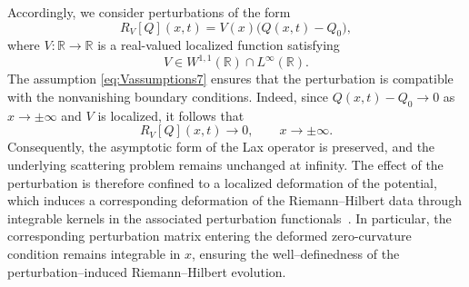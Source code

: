 \documentclass[11pt]{amsart}
\theoremstyle{definition}
\numberwithin{equation}{section}
\begin{document}
Accordingly, we consider perturbations of the form
\begin{equation}
R_V[Q](x,t)=V(x)\bigl(Q(x,t)-Q_0\bigr),
\label{eq:LocalizedPerturbation7}
\end{equation}
where $V:\mathbb{R}\to\mathbb{R}$ is a real-valued localized function satisfying
\begin{equation}
V\in W^{1,1}(\mathbb{R})\cap L^\infty(\mathbb{R}).
\label{eq:Vassumptions7}
\end{equation}
The assumption \eqref{eq:Vassumptions7} ensures that the perturbation is compatible with the nonvanishing boundary conditions. Indeed, since $Q(x,t)-Q_0 \to 0$ as $x\to\pm\infty$ and $V$ is localized, it follows that
\[
R_V[Q](x,t)\to 0, \qquad x\to\pm\infty.
\]
Consequently, the asymptotic form of the Lax operator is preserved, and the underlying scattering problem remains unchanged at infinity. The effect of the perturbation is therefore confined to a localized deformation of the potential, which induces a corresponding deformation of the Riemann--Hilbert data through integrable kernels in the associated perturbation functionals~\cite{AblowitzClarkson1992,Yang2010}. In particular, the corresponding perturbation matrix entering the deformed zero-curvature condition remains integrable in $x$, ensuring the well--definedness of the perturbation--induced Riemann--Hilbert evolution.
\end{document}

